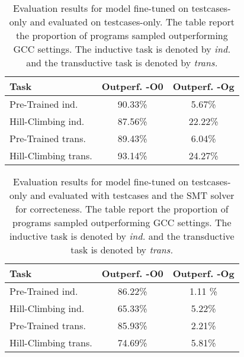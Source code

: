 \documentclass{article}
\begin{document}
\begin{table}[t]
\caption{Evaluation results for model fine-tuned on testcases-only and evaluated on testcases-only. The table report the proportion of programs sampled outperforming GCC settings. The inductive task is denoted by \textit{ind.} and the transductive task is denoted by \textit{trans.}}
\label{tab:random_generation_results}
\vskip 0.15in
\begin{center}
\begin{small}
\begin{sc}
\begin{tabular}{lcc}
\toprule
Task & Outperf. -O0 & Outperf. -Og \\
\midrule
Pre-Trained ind.    & 90.33\% & 5.67\% \\
Hill-Climbing ind.  & 87.56\% & 22.22\% \\
Pre-Trained trans.   & 89.43\% & 6.04\% \\
Hill-Climbing trans.  & 93.14\% & 24.27\% \\
\bottomrule
\end{tabular}
\end{sc}
\end{small}
\end{center}
\vskip -0.1in
\end{table}


\begin{table}[t]
\caption{Evaluation results for model fine-tuned on testcases-only and evaluated with testcases and the SMT solver for correcteness. The table report the proportion of programs sampled outperforming GCC settings. The inductive task is denoted by \textit{ind.} and the transductive task is denoted by \textit{trans.}}
\label{tab:z3_results}
\vskip 0.15in
\begin{center}
\begin{small}
\begin{sc}
\begin{tabular}{lcc}
\toprule
Task & Outperf. -O0 & Outperf. -Og \\
\midrule
Pre-Trained ind.    & 86.22\% & 1.11 \% \\
Hill-Climbing ind.  & 65.33\% & 5.22\% \\
Pre-Trained trans.   & 85.93\% & 2.21\% \\
Hill-Climbing trans.  & 74.69\% & 5.81\% \\
\bottomrule
\end{tabular}
\end{sc}
\end{small}
\end{center}
\vskip -0.1in
\end{table}
\end{document}

